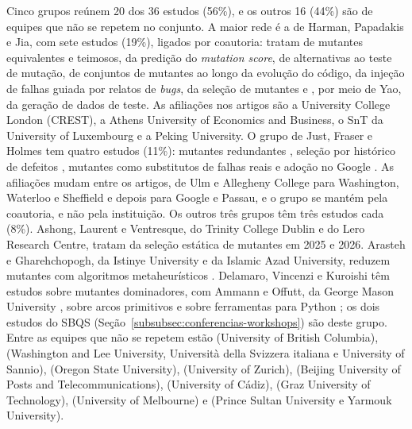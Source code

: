 Cinco grupos reúnem 20 dos 36 estudos (56\%), e os outros 16 (44\%) são de equipes que não se repetem no conjunto. A maior rede é a de Harman, Papadakis e Jia, com sete estudos (19\%), ligados por coautoria:  tratam de mutantes equivalentes e teimosos,  da predição do \textit{mutation score},  de alternativas ao teste de mutação,  de conjuntos de mutantes ao longo da evolução do código,  da injeção de falhas guiada por relatos de \textit{bugs},  da seleção de mutantes e , por meio de Yao, da geração de dados de teste. As afiliações nos artigos são a University College London (CREST), a Athens University of Economics and Business, o SnT da University of Luxembourg e a Peking University. O grupo de Just, Fraser e Holmes tem quatro estudos (11\%): mutantes redundantes \cite{just2012}, seleção por histórico de defeitos \cite{inozemtseva2013}, mutantes como substitutos de falhas reais \cite{just2014} e adoção no Google \cite{petrovic2021}. As afiliações mudam entre os artigos, de Ulm e Allegheny College para Washington, Waterloo e Sheffield e depois para Google e Passau, e o grupo se mantém pela coautoria, e não pela instituição. Os outros três grupos têm três estudos cada (8\%). Ashong, Laurent e Ventresque, do Trinity College Dublin e do Lero Research Centre, tratam da seleção estática de mutantes em 2025 e 2026. Arasteh e Gharehchopogh, da Istinye University e da Islamic Azad University, reduzem mutantes com algoritmos metaheurísticos \cite{shomali2020, arasteh2022, arasteh2023}. Delamaro, Vincenzi e Kuroishi têm estudos sobre mutantes dominadores, com Ammann e Offutt, da George Mason University \cite{kurtz2016}, sobre arcos primitivos \cite{kuroishi2020} e sobre ferramentas para Python \cite{guerino2024}; os dois estudos do SBQS (Seção~\ref{subsubsec:conferencias-workshops}) são deste grupo. Entre as equipes que não se repetem estão  (University of British Columbia),  (Washington and Lee University, Università della Svizzera italiana e University of Sannio),  (Oregon State University),  (University of Zurich),  (Beijing University of Posts and Telecommunications),  (University of Cádiz),  (Graz University of Technology),  (University of Melbourne) e  (Prince Sultan University e Yarmouk University).

